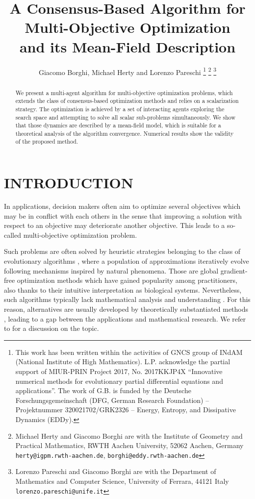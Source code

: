 \documentclass[letterpaper, 10 pt, conference]{ieeeconf}  %
\title{\LARGE \bf
A Consensus-Based Algorithm for Multi-Objective Optimization \\and its Mean-Field Description
}
\author{Giacomo Borghi, Michael Herty and Lorenzo Pareschi%
\thanks{This work has been written within the
activities of GNCS group of INdAM (National Institute of
High Mathematics). L.P. acknowledge the partial support of MIUR-PRIN Project 2017, No. 2017KKJP4X “Innovative numerical methods for evolutionary partial differential equations and applications”.  
The work of G.B. is funded by the Deutsche Forschungsgemeinschaft (DFG, German Research Foundation) – Projektnummer 320021702/GRK2326 – Energy, Entropy, and Dissipative Dynamics (EDDy).
}%
\thanks{Michael Herty and Giacomo Borghi are with the Institute of Geometry and Practical Mathematics, RWTH Aachen University, 52062 Aachen, Germany
        {\tt\small herty@igpm.rwth-aachen.de}, {\tt\small borghi@eddy.rwth-aachen.de}}%
\thanks{Lorenzo Pareschi and Giacomo Borghi are with the Department of Mathematics and Computer Science, University of Ferrara, 44121 Italy      
	 {\tt\small lorenzo.pareschi@unife.it}}}%
\begin{document}
\maketitle
\thispagestyle{empty}
\pagestyle{empty}


\begin{abstract}
We present a multi-agent algorithm for multi-objective optimization problems, which extends the class of consensus-based optimization methods and relies on a scalarization strategy. The optimization is achieved by a set of interacting agents exploring the search space and attempting to solve all scalar sub-problems simultaneously. We show that those dynamics are described by a mean-field model, which is suitable for a theoretical analysis of the algorithm convergence. Numerical results show the validity of the proposed method.
\end{abstract}





\section{INTRODUCTION}

In applications, decision makers often aim to optimize several objectives which may be in conflict with each others in the sense that improving a solution with respect to an objective may deteriorate another objective. This leads to a so-called multi-objective optimization problem. 

Such problems are often solved by heuristic strategies belonging to the class of evolutionary algorithms \cite{deb2001multi}, where a population of approximations iteratively evolve following mechanisms inspired by natural phenomena. Those are global gradient-free optimization methods which have gained popularity among practitioners, also thanks to their intuitive interpretation as biological systems. Nevertheless, such algorithms typically lack mathematical analysis and understanding \cite{Hooker1995}. For this reason, alternatives are usually developed by
theoretically substantiated methods \cite{Pardalos2018}, leading to a gap between the applications and mathematical research. We refer to \cite{Sergeyev2018} for a discussion on the topic. 
\end{document}
